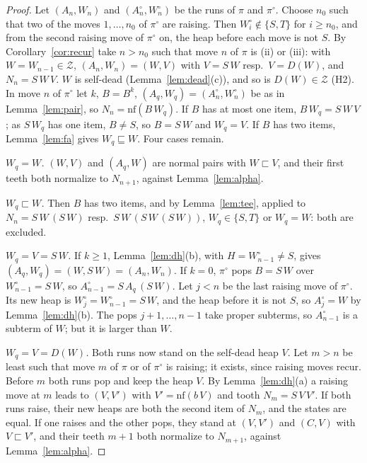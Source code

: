 \documentclass[11pt]{amsart}
\theoremstyle{definition}
\newcommand{\nf}{\mathrm{nf}}
\newcommand{\Zc}{\mathcal Z}
\newcommand{\sqs}{\sqsubseteq}
\newcommand{\psq}{\sqsubset}
\begin{document}
\begin{proof}
Let $(A_n,W_n)$ and $(A^\circ_n,W^\circ_n)$ be the runs of $\pi$ and $\pi^\circ$. Choose $n_0$ such
that two of the moves $1,\dots,n_0$ of $\pi^\circ$ are raising. Then $W^\circ_i\notin\{S,T\}$ for $i\ge n_0$, and from the second raising move of $\pi^\circ$ on, the
heap before each move is not $S$.
By Corollary~\ref{cor:recur} take $n>n_0$ such that move $n$ of $\pi$ is (ii) or (iii): with
$W=W_{n-1}\in\Zc$, $(A_n,W_n)=(W,V)$ with $V=S\,W$ resp.\ $V=D(W)$, and $N_n=S\,W\,V$. $W$ is
self-dead (Lemma~\ref{lem:dead}(c)), and so is $D(W)\in\Zc$ (H2). In move $n$ of $\pi^\circ$ let $k$,
$B=B^k$, $(A_q,W_q)=(A^\circ_n,W^\circ_n)$ be as in Lemma~\ref{lem:pair}, so $N_n=\nf(B\,W_q)$. If
$B$ has at most one item, $B\,W_q=S\,W\,V$; as $S\,W_q$ has one item, $B\ne S$, so $B=S\,W$ and
$W_q=V$. If $B$ has two items,
Lemma~\ref{lem:fa} gives $W_q\sqs W$. Four cases remain.

\emph{$W_q=W$.} $(W,V)$ and $(A_q,W)$ are normal pairs with $W\psq V$, and their first teeth both
normalize to $N_{n+1}$, against Lemma~\ref{lem:alpha}.

\emph{$W_q\psq W$.} Then $B$ has two items, and by Lemma~\ref{lem:tee}, applied to
$N_n=S\,W\,(S\,W)$ resp.\ $S\,W\,(S\,W\,(S\,W))$, $W_q\in\{S,T\}$ or $W_q=W$: both are excluded.

\emph{$W_q=V=S\,W$.} If $k\ge1$, Lemma~\ref{lem:dh}(b), with $H=W^\circ_{n-1}\ne S$, gives
$(A_q,W_q)=(W,S\,W)=(A_n,W_n)$. If $k=0$, $\pi^\circ$ pops $B=S\,W$ over $W^\circ_{n-1}=S\,W$, so
$A^\circ_{n-1}=S\,A_q\,(S\,W)$. Let $j<n$ be the last raising move of $\pi^\circ$. Its new heap is
$W^\circ_j=W^\circ_{n-1}=S\,W$, and the heap before it is not $S$, so $A^\circ_j=W$ by
Lemma~\ref{lem:dh}(b). The pops $j+1,\dots,n-1$ take proper subterms, so $A^\circ_{n-1}$ is a
subterm of $W$; but it is larger than $W$.

\emph{$W_q=V=D(W)$.} Both runs now stand on the self-dead heap $V$. Let $m>n$ be least such that
move $m$ of $\pi$ or of $\pi^\circ$ is raising; it exists, since raising moves recur. Before $m$ both runs
pop and keep the heap $V$. By Lemma~\ref{lem:dh}(a) a raising move at $m$ leads to $(V,V')$ with
$V'=\nf(b\,V)$ and tooth $N_m=S\,V\,V'$. If both runs raise, their new heaps are both the second
item of $N_m$, and the states are equal. If one raises and the other pops, they stand at $(V,V')$
and $(C,V)$ with $V\psq V'$, and their teeth $m+1$ both normalize to $N_{m+1}$, against
Lemma~\ref{lem:alpha}.
\end{proof}
\end{document}
